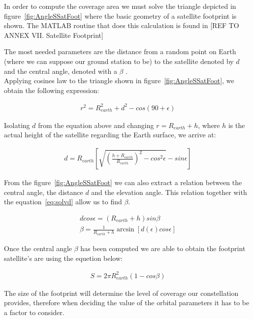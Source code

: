  In order to compute the coverage area we must solve the triangle depicted in figure~\ref{fig:AngleSSatFoot} where the basic geometry of a satellite footprint is shown. The MATLAB routine that does this calculation is found in [{REF TO ANNEX VII. Satellite Footprint}]

 The most needed parameters are the distance from a random point on Earth (where we can suppose our ground station to be) to the satellite denoted by $d$ and the central angle, denoted with a $\beta$ . \\
 
 Applying cosines law to the triangle shown in figure~\ref{fig:AngleSSatFoot}, we obtain the following expression:
 
 \begin{equation} 
\begin{gathered}
r^2=R_{earth}^2+d^2-cos(90+\epsilon)
\end{gathered}
\label{eq:Tcos}
\end{equation}
 
 Isolating $d$ from the equation above and changing $r=R_{earth}+h$, where $h$ is the actual height of the satellite regarding the Earth surface, we arrive at:
 
\begin{equation}
\begin{gathered}
d=R_{earth}\left[ \sqrt{\left(\frac{h+R_{earth}}{R_{earth}}\right)^2-cos^2\epsilon}-sin\epsilon\right]
\end{gathered}
\label{eq:solvd}
\end{equation}

From the figure~\ref{fig:AngleSSatFoot} we can also extract a relation between the central angle, the distance $d$ and the elevation angle. This relation together with the equation~\ref{eq:solvd} allow us to find $\beta$. 

\begin{equation}
\begin{gathered}
d cos\epsilon=\left(R_{earth}+h\right)sin\beta \\
\beta=\frac{1}{R_{earth}+h}\arcsin\left[d(\epsilon)cos\epsilon\right]
\end{gathered}
\label{eq:solvb}
\end{equation}

Once the central angle $\beta$ has been computed we are able to obtain the footprint satellite's are using the equetion below:

\begin{equation}
\begin{gathered}
S=2 \pi R_{earth}^2 (1-cos\beta)
\end{gathered}
\label{eq:solvS}
\end{equation}

The size of the footprint will determine the level of coverage our constellation provides, therefore when deciding the value of the orbital parameters it has to be a factor to consider.

